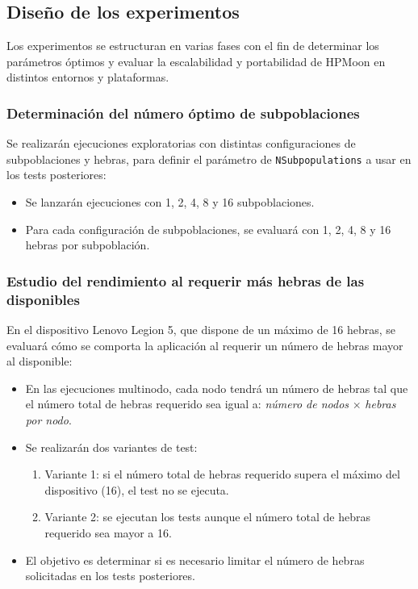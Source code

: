 \subsection{Diseño de los experimentos}\label{subsec:diseno_experimentos_detallado}

Los experimentos se estructuran en varias fases con el fin de determinar los parámetros óptimos y evaluar la escalabilidad y portabilidad de HPMoon en distintos entornos y plataformas.

\subsubsection{Determinación del número óptimo de subpoblaciones}

Se realizarán ejecuciones exploratorias con distintas configuraciones de subpoblaciones y hebras, para definir el parámetro de \texttt{NSubpopulations} a usar en los tests posteriores:

\begin{itemize}
    \item Se lanzarán ejecuciones con 1, 2, 4, 8 y 16 subpoblaciones.
    \item Para cada configuración de subpoblaciones, se evaluará con 1, 2, 4, 8 y 16 hebras por subpoblación.
\end{itemize}

\subsubsection{Estudio del rendimiento al requerir más hebras de las disponibles}

En el dispositivo Lenovo Legion 5, que dispone de un máximo de 16 hebras, se evaluará cómo se comporta la aplicación al requerir un número de hebras mayor al disponible:

\begin{itemize}
    \item En las ejecuciones multinodo, cada nodo tendrá un número de hebras tal que el número total de hebras requerido sea igual a: \textit{número de nodos} $\times$ \textit{hebras por nodo}.
    \item Se realizarán dos variantes de test:
          \begin{enumerate}
              \item Variante 1: si el número total de hebras requerido supera el máximo del dispositivo (16), el test no se ejecuta.
              \item Variante 2: se ejecutan los tests aunque el número total de hebras requerido sea mayor a 16.
          \end{enumerate}
    \item El objetivo es determinar si es necesario limitar el número de hebras solicitadas en los tests posteriores.
\end{itemize}

